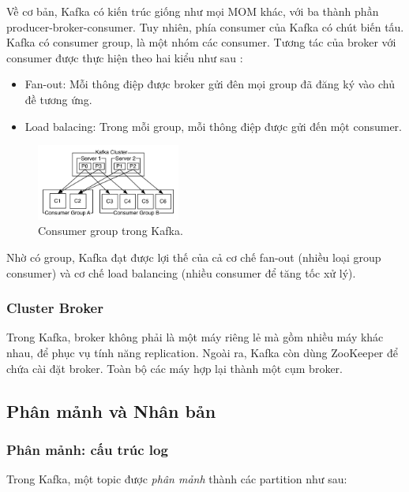 \documentclass{article}
\begin{document}
Về cơ bản, Kafka có kiến trúc giống như mọi MOM khác, với ba thành phần
producer-broker-consumer. Tuy nhiên, phía consumer của Kafka có chút biến tấu.
Kafka có consumer group, là một nhóm các consumer. Tương tác của broker với
consumer được thực hiện theo hai kiểu như sau \cite{kafka_detail}:

\begin{itemize}
    \item Fan-out: Mỗi thông điệp được broker gửi đên mọi group đã đăng ký vào
        chủ đề tương ứng.
    \item Load balacing: Trong mỗi group, mỗi thông điệp được gửi đến một
        consumer.
\end{itemize}

\begin{figure}
    \centering
    \includegraphics[width=0.42\textwidth]{consumer_groups.png}
    \caption{Consumer group trong Kafka.}
\end{figure}

Nhờ có group, Kafka đạt được lợi thế của cả cơ chế fan-out (nhiều loại group
consumer) và cơ chế load balancing (nhiều consumer để tăng tốc xử lý).

\subsubsection{Cluster Broker}

Trong Kafka, broker không phải là một máy riêng lẻ mà gồm nhiều máy khác nhau,
để phục vụ tính năng replication. Ngoài ra, Kafka còn dùng ZooKeeper để chứa cài
đặt broker. Toàn bộ các máy hợp lại thành một cụm broker.

\subsection{Phân mảnh và Nhân bản}

\subsubsection{Phân mảnh: cấu trúc log}

Trong Kafka, một topic được \emph{phân mảnh} thành các partition như sau:
\end{document}
